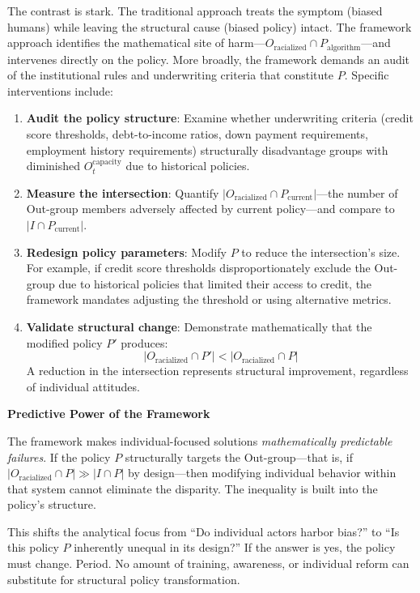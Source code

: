 \documentclass[12pt,openany]{book}
\begin{document}
\medskip
The contrast is stark. The traditional approach treats the symptom (biased humans) while leaving the structural cause (biased policy) intact. The framework approach identifies the mathematical site of harm---$O_{\text{racialized}} \cap P_{\text{algorithm}}$---and intervenes directly on the policy. More broadly, the framework demands an audit of the institutional rules and underwriting criteria that constitute $P$. Specific interventions include:
\begin{enumerate}
    \item \textbf{Audit the policy structure}: Examine whether underwriting criteria (credit score thresholds, debt-to-income ratios, down payment requirements, employment history requirements) structurally disadvantage groups with diminished $O_t^{\text{capacity}}$ due to historical policies.
    
    \item \textbf{Measure the intersection}: Quantify $|O_{\text{racialized}} \cap P_{\text{current}}|$---the number of Out-group members adversely affected by current policy---and compare to $|I \cap P_{\text{current}}|$.
    
    \item \textbf{Redesign policy parameters}: Modify $P$ to reduce the intersection's size. For example, if credit score thresholds disproportionately exclude the Out-group due to historical policies that limited their access to credit, the framework mandates adjusting the threshold or using alternative metrics.
    
    \item \textbf{Validate structural change}: Demonstrate mathematically that the modified policy $P'$ produces:
    \[
    |O_{\text{racialized}} \cap P'| < |O_{\text{racialized}} \cap P|
    \]
    A reduction in the intersection represents structural improvement, regardless of individual attitudes.
\end{enumerate}

\textbf{Predictive Power of the Framework}

The framework makes individual-focused solutions \textit{mathematically predictable failures}. If the policy $P$ structurally targets the Out-group---that is, if $|O_{\text{racialized}} \cap P| \gg |I \cap P|$ by design---then modifying individual behavior within that system cannot eliminate the disparity. The inequality is built into the policy's structure.

This shifts the analytical focus from ``Do individual actors harbor bias?'' to ``Is this policy $P$ inherently unequal in its design?'' If the answer is yes, the policy must change. Period. No amount of training, awareness, or individual reform can substitute for structural policy transformation.
\end{document}
